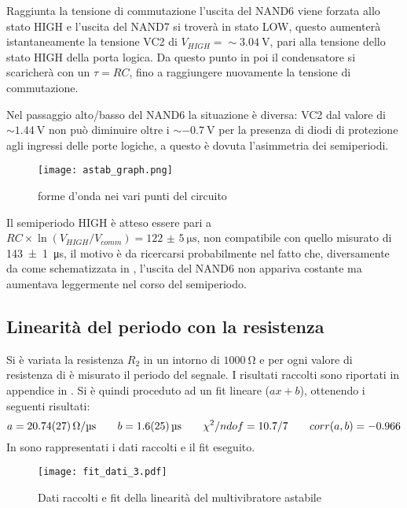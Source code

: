 Raggiunta la tensione di commutazione l'uscita del NAND6 viene forzata allo stato HIGH e l'uscita del NAND7 si troverà in stato LOW, questo aumenterà istantaneamente la tensione VC2 di $V_{HIGH}=\sim \SI{3.04}{\volt}$, pari alla tensione dello stato HIGH della porta logica. Da questo punto in poi il condensatore si scaricherà con un $\tau = RC$, fino a raggiungere nuovamente la tensione di commutazione.

Nel passaggio alto/basso del NAND6 la situazione è diversa: VC2 dal valore di $\sim \SI{1.44}{\volt}$ non può diminuire oltre i $\sim\SI{-0.7}{\volt}$ per la presenza di diodi di protezione agli ingressi delle porte logiche, a questo è dovuta l'asimmetria dei semiperiodi.

\begin{figure}[H]
	\centering
	\texttt{[image: astab\_graph.png]}
	\caption{forme d'onda nei vari punti del circuito}
	\label{astab_expl}
\end{figure}

Il semiperiodo HIGH è atteso essere pari a $RC\times \ln(V_{HIGH}/V_{comm}) = \SI{122(5)}{\micro\second}$, non compatibile con quello misurato di \SI{143(1)}{\micro\second}, il motivo è da ricercarsi probabilmente nel fatto che, diversamente da come schematizzata in , l'uscita del NAND6 non appariva costante ma aumentava leggermente nel corso del semiperiodo.
	
\subsection{Linearità del periodo con la resistenza}
Si è variata la resistenza $R_2$ in un intorno di $\SI{1000}{\ohm}$ e per ogni valore di resistenza di è misurato il periodo del segnale. I risultati raccolti sono riportati in appendice in .
Si è quindi proceduto ad un fit lineare ($ax+b$), ottenendo i seguenti risultati:
$$a = \SI{20.74(27)}{\ohm / \micro\second} \qquad b=\SI{1.6 \pm 2.5}{\micro \second} \qquad \chi^2/ndof = 10.7/7 \qquad corr(a,b)= -0.966$$
In  sono rappresentati i dati raccolti e il fit eseguito.

\begin{figure}[h!]
	\centering
	\texttt{[image: fit\_dati\_3.pdf]}
	\caption{Dati raccolti e fit della linearità del multivibratore astabile}
	\label{astab_lin}
\end{figure}




